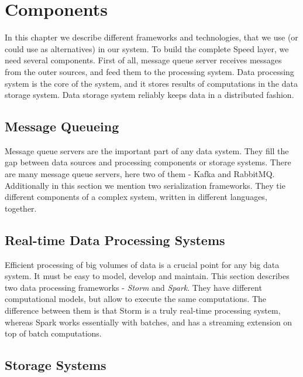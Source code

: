 \chapter{Components}
\label{chap:components}

In this chapter we describe different frameworks and technologies, that we use (or could use as alternatives) in our system.
To build the complete Speed layer, we need several components.
First of all, message queue server receives messages from the outer sources, and feed them to the processing system.
Data processing system is the core of the system, and it stores results of computations in the data storage system.
Data storage system reliably keeps data in a distributed fashion. 

\section{Message Queueing}

Message queue servers are the important part of any data system.
They fill the gap between data sources and processing components or storage systems.
There are many message queue servers, here two of them - Kafka and RabbitMQ.
Additionally in this section we mention two serialization frameworks.
They tie different components of a complex system, written in different languages, together.






\section{Real-time Data Processing Systems}

Efficient processing of big volumes of data is a crucial point for any big data system.
It must be easy to model, develop and maintain.
This section describes two data processing frameworks - \textit{Storm} and \textit{Spark}.
They have different computational models, but allow to execute the same computations.
The difference between them is that Storm is a truly real-time processing system, whereas Spark works essentially with batches, and has a streaming extension on top of batch computations.




\section{Storage Systems}

